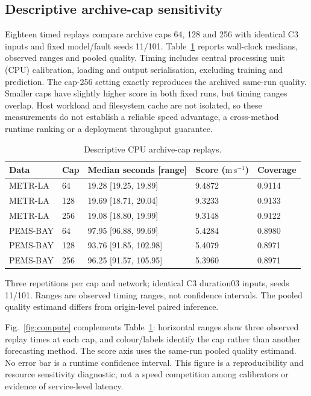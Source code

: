 \documentclass[pdflatex,sn-mathphys-num]{sn-jnl}
\newcommand{\ms}{\mathrm{m\,s^{-1}}}
\begin{document}
\subsection{Descriptive archive-cap sensitivity}\label{sec:runtime}

Eighteen timed replays compare archive caps 64, 128 and 256 with identical C3 inputs and fixed model/fault seeds 11/101. Table~\ref{tab:runtime} reports wall-clock medians, observed ranges and pooled quality. Timing includes central processing unit (CPU) calibration, loading and output serialisation, excluding training and prediction. The cap-256 setting exactly reproduces the archived same-run quality. Smaller caps have slightly higher score in both fixed runs, but timing ranges overlap. Host workload and filesystem cache are not isolated, so these measurements do not establish a reliable speed advantage, a cross-method runtime ranking or a deployment throughput guarantee.

\begin{table}[!htbp]
\caption{Descriptive CPU archive-cap replays.}\label{tab:runtime}
\centering\setlength{\tabcolsep}{3pt}\small
\begin{tabular}{lllll}\toprule
Data & Cap & Median seconds [range] & Score ($\ms$) & Coverage \\\midrule
METR-LA & 64 & 19.28 [19.25, 19.89] & 9.4872 & 0.9114 \\
METR-LA & 128 & 19.69 [18.71, 20.04] & 9.3233 & 0.9133 \\
METR-LA & 256 & 19.08 [18.80, 19.99] & 9.3148 & 0.9122 \\
PEMS-BAY & 64 & 97.95 [96.88, 99.69] & 5.4284 & 0.8980 \\
PEMS-BAY & 128 & 93.76 [91.85, 102.98] & 5.4079 & 0.8971 \\
PEMS-BAY & 256 & 96.25 [91.57, 105.95] & 5.3960 & 0.8971 \\
\bottomrule\end{tabular}
\par\smallskip\footnotesize Three repetitions per cap and network; identical C3 duration03 inputs, seeds 11/101. Ranges are observed timing ranges, not confidence intervals. The pooled quality estimand differs from origin-level paired inference.
\end{table}
\FloatBarrier


Fig.~\ref{fig:compute} complements Table~\ref{tab:runtime}: horizontal ranges show three observed replay times at each cap, and colour/labels identify the cap rather than another forecasting method. The score axis uses the same-run pooled quality estimand. No error bar is a runtime confidence interval. This figure is a reproducibility and resource sensitivity diagnostic, not a speed competition among calibrators or evidence of service-level latency.
\end{document}

